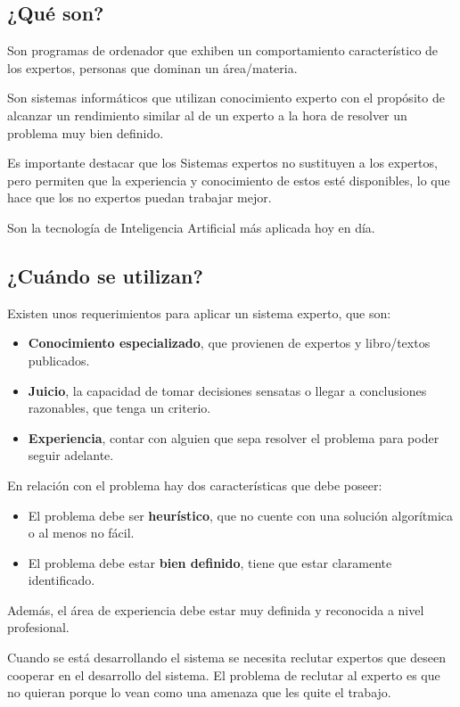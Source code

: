 \documentclass[12pt, twoside, openright]{report} %
\begin{document}
\subsection{¿Qué son?}
Son programas de ordenador que exhiben un comportamiento característico de los expertos, personas que dominan un área/materia.

Son sistemas informáticos que utilizan conocimiento experto con el propósito de alcanzar un rendimiento similar al de un experto a la hora de resolver un problema muy bien definido.

Es importante destacar que los Sistemas expertos no sustituyen a los expertos, pero permiten que la experiencia y conocimiento de estos esté disponibles, lo que hace que los no expertos puedan trabajar mejor.

Son la tecnología de Inteligencia Artificial más aplicada hoy en día.

\subsection{¿Cuándo se utilizan?}
Existen unos requerimientos para aplicar un sistema experto, que son:
\begin{itemize}
	\item \textbf{Conocimiento especializado}, que provienen de expertos y libro/textos publicados.
	\item \textbf{Juicio}, la capacidad de tomar decisiones sensatas o llegar a conclusiones razonables, que tenga un criterio.
	\item \textbf{Experiencia}, contar con alguien que sepa resolver el problema para poder seguir adelante.
\end{itemize}

En relación con el problema hay dos características que debe poseer:
\begin{itemize}
	\item El problema debe ser \textbf{heurístico}, que no cuente con una solución algorítmica o al menos no fácil.
	\item El problema debe estar \textbf{bien definido}, tiene que estar claramente identificado.
\end{itemize}
Además, el área de experiencia debe estar muy definida y reconocida a nivel profesional.

Cuando se está desarrollando el sistema se necesita reclutar expertos que deseen cooperar en el desarrollo del sistema. El problema de reclutar al experto es que no quieran porque lo vean como una amenaza que les quite el trabajo.
\end{document}
